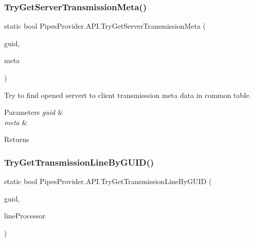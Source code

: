 \subsubsection{\texorpdfstring{Try\+Get\+Server\+Transmission\+Meta()}{TryGetServerTransmissionMeta()}}
{\footnotesize\ttfamily static bool Pipes\+Provider.\+A\+P\+I.\+Try\+Get\+Server\+Transmission\+Meta (\begin{DoxyParamCaption}\item[{string}]{guid,  }\item[{out \mbox{\hyperlink{class_pipes_provider_1_1_server_transmission_meta}{Server\+Transmission\+Meta}}}]{meta }\end{DoxyParamCaption})\hspace{0.3cm}{\ttfamily [static]}}



Try to find opened servert to client transmisssion meta data in common table. 


\begin{DoxyParams}{Parameters}
{\em guid} & \\
\hline
{\em meta} & \\
\hline
\end{DoxyParams}
\begin{DoxyReturn}{Returns}

\end{DoxyReturn}
\mbox{\label{class_pipes_provider_1_1_a_p_i_ae1abc16273a4b459fdbf63e68c44d11f}} 
\subsubsection{\texorpdfstring{Try\+Get\+Transmission\+Line\+By\+G\+U\+I\+D()}{TryGetTransmissionLineByGUID()}}
{\footnotesize\ttfamily static bool Pipes\+Provider.\+A\+P\+I.\+Try\+Get\+Transmission\+Line\+By\+G\+U\+ID (\begin{DoxyParamCaption}\item[{string}]{guid,  }\item[{out \mbox{\hyperlink{class_pipes_provider_1_1_transmission_line}{Transmission\+Line}}}]{line\+Processor }\end{DoxyParamCaption})\hspace{0.3cm}{\ttfamily [static]}}




